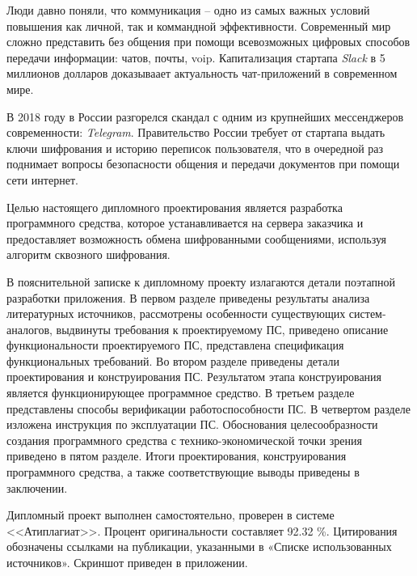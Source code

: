 
Люди давно поняли, что коммуникация -- одно из самых важных условий повышения как личной, так и коммандной эффективности. Современный мир сложно представить без общения при помощи всевозможных цифровых способов передачи информации: чатов, почты, \gls{voip}. Капитализация стартапа \textit{Slack} в 5 миллионов долларов\cite{slack:capitalization} доказываает актуальность чат-приложений в современном мире.

В 2018 году в России разгорелся скандал с одним из крупнейших мессенджеров современности: \textit{Telegram}. Правительство России требует от стартапа выдать ключи шифрования и историю переписок пользователя, что в очередной раз поднимает вопросы безопасности общения и передачи документов при помощи сети интернет\cite{telegram:vs:rkn}.

Целью настоящего дипломного проектирования является разработка программного средства, которое устанавливается на сервера заказчика и предоставляет возможность обмена шифрованными сообщениями, используя алгоритм сквозного шифрования.

В пояснительной записке к дипломному проекту излагаются детали поэтапной разработки приложения. В первом разделе приведены результаты анализа литературных источников, рассмотрены особенности существующих систем-аналогов, выдвинуты требования к проектируемому ПС, приведено описание функциональности проектируемого ПС, представлена спецификация функциональных требований. Во втором разделе приведены детали проектирования и конструирования ПС. Результатом этапа конструирования является функционирующее программное средство. В третьем разделе представлены способы верификации работоспособности ПС. В четвертом разделе изложена инструкция по эксплуатации ПС. Обоснования целесообразности создания программного средства с технико-экономической точки зрения приведено в пятом разделе. Итоги проектирования, конструирования программного средства, а также соответствующие выводы приведены в заключении.

Дипломный проект выполнен самостоятельно, проверен в системе <<Атиплагиат>>. Процент оригинальности составляет \num{92.32} \%. Цитирования обозначены ссылками на публикации, указанными в «Списке использованных источников».
Скриншот приведен в приложении.